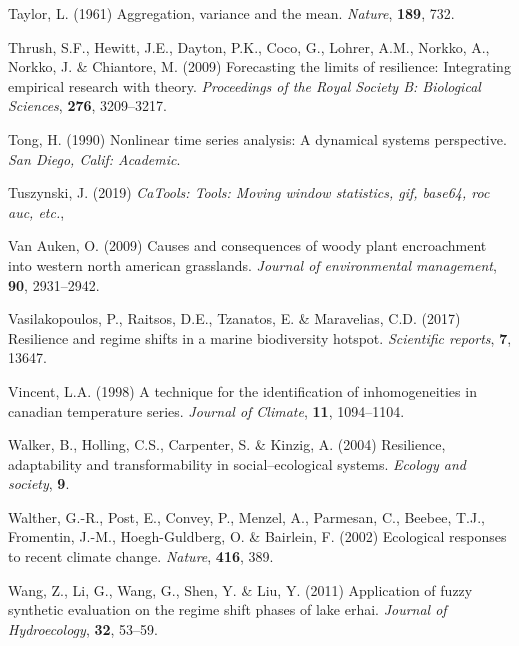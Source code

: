 \documentclass[12pt,twoside,openany]{reedthesis}
\begin{document}
\leavevmode\hypertarget{ref-taylor1961aggregation}{}%
Taylor, L. (1961) Aggregation, variance and the mean. \emph{Nature}, \textbf{189}, 732.

\leavevmode\hypertarget{ref-thrush2009forecasting}{}%
Thrush, S.F., Hewitt, J.E., Dayton, P.K., Coco, G., Lohrer, A.M., Norkko, A., Norkko, J. \& Chiantore, M. (2009) Forecasting the limits of resilience: Integrating empirical research with theory. \emph{Proceedings of the Royal Society B: Biological Sciences}, \textbf{276}, 3209--3217.

\leavevmode\hypertarget{ref-tong1990nonlinear}{}%
Tong, H. (1990) Nonlinear time series analysis: A dynamical systems perspective. \emph{San Diego, Calif: Academic}.

\leavevmode\hypertarget{ref-caTools}{}%
Tuszynski, J. (2019) \emph{CaTools: Tools: Moving window statistics, gif, base64, roc auc, etc.},

\leavevmode\hypertarget{ref-van2009causes}{}%
Van Auken, O. (2009) Causes and consequences of woody plant encroachment into western north american grasslands. \emph{Journal of environmental management}, \textbf{90}, 2931--2942.

\leavevmode\hypertarget{ref-vasilakopoulos2017resilience}{}%
Vasilakopoulos, P., Raitsos, D.E., Tzanatos, E. \& Maravelias, C.D. (2017) Resilience and regime shifts in a marine biodiversity hotspot. \emph{Scientific reports}, \textbf{7}, 13647.

\leavevmode\hypertarget{ref-vincent1998technique}{}%
Vincent, L.A. (1998) A technique for the identification of inhomogeneities in canadian temperature series. \emph{Journal of Climate}, \textbf{11}, 1094--1104.

\leavevmode\hypertarget{ref-walker2004resilience}{}%
Walker, B., Holling, C.S., Carpenter, S. \& Kinzig, A. (2004) Resilience, adaptability and transformability in social--ecological systems. \emph{Ecology and society}, \textbf{9}.

\leavevmode\hypertarget{ref-walther_ecological_2002}{}%
Walther, G.-R., Post, E., Convey, P., Menzel, A., Parmesan, C., Beebee, T.J., Fromentin, J.-M., Hoegh-Guldberg, O. \& Bairlein, F. (2002) Ecological responses to recent climate change. \emph{Nature}, \textbf{416}, 389.

\leavevmode\hypertarget{ref-wang2011application}{}%
Wang, Z., Li, G., Wang, G., Shen, Y. \& Liu, Y. (2011) Application of fuzzy synthetic evaluation on the regime shift phases of lake erhai. \emph{Journal of Hydroecology}, \textbf{32}, 53--59.
\end{document}

